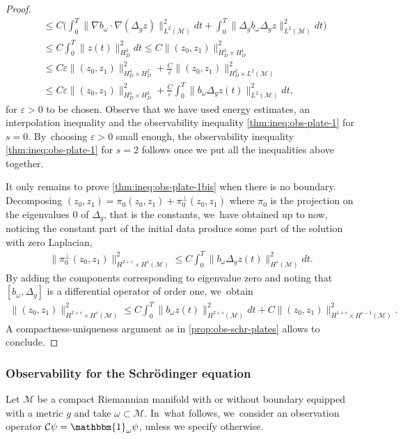 \documentclass[10pt]{amsart}
\theoremstyle{definition}
\let\mc\mathcal
\let\veps\varepsilon
\newcommand{\M}{\mc{M}}
\providecommand{\norm}[1]{\lVert#1\rVert}
\begin{document}
\begin{proof}
\begin{align*}
&\leq C\biggl(\int_0^T \norm{\nabla b_\omega\cdot\nabla(\Delta_g z)}_{L^2(\M)}^2dt
+\int_0^T \norm{\Delta_g b_\omega\Delta_g z}_{L^2(\M)}^2dt\biggr)\\
&\leq C\int_0^T \norm{z(t)}_{H_D^3}^2dt \leq C\norm{(z_0, z_1)}_{H_D^3\times H_D^1}^2\\
&\leq C\veps \norm{(z_0, z_1)}_{H_D^4\times H_D^2}^2
+\frac{C}{\veps}\norm{(z_0, z_1)}_{H_D^2\times L^2(\M)}^2\\
&\leq C\veps \norm{(z_0, z_1)}_{H_D^4\times H_D^2}^2
+\frac{C}{\veps}\int_0^T \norm{b_\omega \Delta_g z(t)}_{L^2(\M)}^2 dt,
\end{align*}
for $\veps>0$ to be chosen. Observe that we have used energy estimates, an interpolation inequality and the observability inequality \eqref{thm:ineq:obs-plate-1} for $s=0$. By~choosing $\veps>0$ small enough, the observability inequality \eqref{thm:ineq:obs-plate-1} for $s=2$ follows once we put all the inequalities above together.

It only remains to prove \eqref{thm:ineq:obs-plate-1bis} when there is no boundary. Decomposing $(z_0,z_1)=\pi_0(z_0,z_1)+\pi_0^{\perp}(z_0,z_1)$ where $\pi_0$ is the projection on the eigenvalues $0$ of $\Delta_g$, that is the constants, we~have obtained up to now, noticing the constant part of the initial data produce some part of the solution with zero Laplacian,
\begin{align*}
\norm{\pi_0^{\perp}(z_0,z_1)}_{H^{2+s}\times H^s(\M)}^2\leq C\int_0^T \norm{b_\omega \Delta_g z(t)}_{H^s(\M)}^2 dt.
\end{align*}
By adding the components corresponding to eigenvalue zero and noting that $[b_{\omega},\Delta_g]$ is a differential operator of order one, we~obtain
\begin{align*}
\norm{(z_0,z_1)}_{H^{2+s}\times H^s(\M)}^2\leq C\int_0^T \norm{ b_\omega z(t)}_{H^{2+s}(\M)}^2 dt+C\norm{(z_0,z_1)}_{H^{1+s}\times H^{s-1}(\M)}^2.
\end{align*}
A compactness-uniqueness argument as in \cref{prop:obs-schr-plates} allows to conclude.
\end{proof}
\subsubsection{Observability for the Schrödinger equation}\label{sssec:obs-schr} Let $\M$ be a compact Riemannian manifold with or without boundary equipped with a metric $g$ and take $\omega\subset \M$. In~what follows, we~consider an observation operator $\mathcal{C}\psi=\mathbbm{1}_\omega \psi$, unless we specify otherwise.
\end{document}
